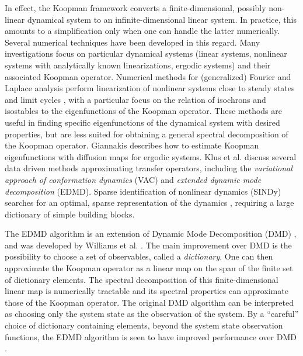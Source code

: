 \documentclass[%
 aip,
 cha,
 sd,%
 amsmath,amssymb,
 preprint,%
]{revtex4-1}
\begin{document}
In effect, the Koopman framework converts a finite-dimensional, possibly non-linear dynamical system to an infinite-dimensional linear system. In practice, this amounts to a simplification only when one can handle the latter numerically. Several numerical techniques have been developed in this regard. Many investigations focus on particular dynamical systems (linear systems, nonlinear systems with analytically known linearizations, ergodic systems) and their associated Koopman operator.
Numerical methods for (generalized) Fourier and Laplace analysis perform linearization of nonlinear systems close to steady states and limit cycles \cite{mezic-2013,mauroy-2013}, with a particular focus on the relation of isochrons and isostables to the eigenfunctions of the Koopman operator. These methods are useful in finding specific eigenfunctions of the dynamical system with desired properties, but are less suited for obtaining a general spectral decomposition of the Koopman operator. Giannakis \cite{giannakis-2015} describes how to estimate Koopman eigenfunctions with diffusion maps for ergodic systems.
Klus et al. \cite{klus-2017} discuss several data driven methods approximating transfer operators, including the \textit{variational approach of conformation dynamics} (VAC) and \textit{extended dynamic mode decomposition} (EDMD). Sparse identification of nonlinear dynamics (SINDy) searches for an optimal, sparse representation of the dynamics \cite{brunton-2016c,wu-2017}, requiring a large dictionary of simple building blocks.

The EDMD algorithm is an extension of Dynamic Mode Decomposition (DMD) \cite{rowley2009spectral,schmid2010dynamic}, and was developed by Williams et al. \cite{williams2014kernel,williams2015data}. The main improvement over DMD is the possibility to choose a set of observables, called a \textit{dictionary}. One can then approximate the Koopman operator as a linear map on the span of the finite set of dictionary elements. The spectral decomposition of this finite-dimensional linear map is numerically tractable and its spectral properties can approximate those of the Koopman operator. The original DMD algorithm can be interpreted as choosing only the system state as the observation of the system. By a ``careful'' choice of dictionary containing elements, beyond the system state observation functions, the EDMD algorithm is seen to have improved performance over DMD \cite{williams2015data}. 
\end{document}
